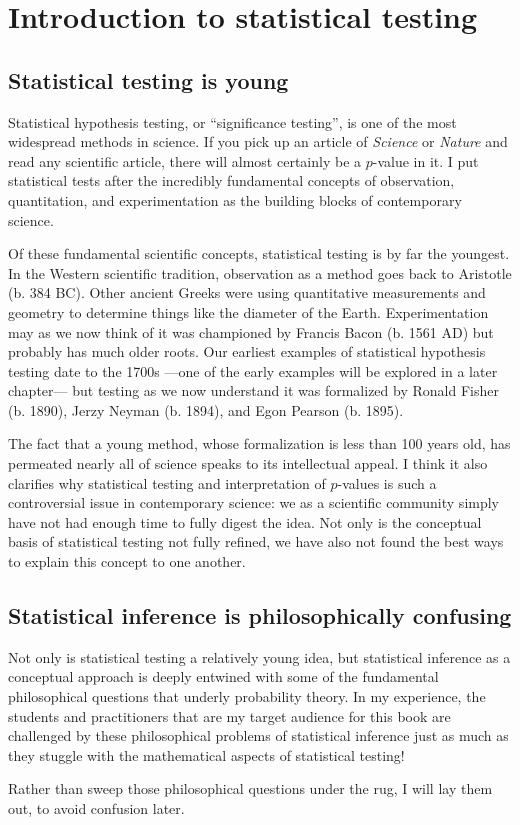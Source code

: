
\chapter{Introduction to statistical testing}

\section{Statistical testing is young}

Statistical hypothesis testing, or ``significance testing'', is one of the most
widespread methods in science. If you pick up an article of \textit{Science} or
\textit{Nature} and read any scientific article, there will almost certainly
be a $p$-value in
it. I put statistical tests after the incredibly fundamental concepts of
observation, quantitation, and experimentation as the building blocks of
contemporary science.

Of these fundamental scientific concepts, statistical testing is by far the youngest.
In the
Western scientific tradition, observation as a method goes back to Aristotle
(b. 384 BC). Other ancient Greeks were using quantitative measurements and
geometry to
determine things like the diameter of the Earth. Experimentation may as we now
think of it was championed by Francis Bacon (b. 1561 AD) but probably has much
older roots. Our earliest examples of statistical hypothesis testing date to
the 1700s ---one of the early examples will be explored in a later chapter---
but testing as we now understand it was formalized by Ronald Fisher (b. 1890),
Jerzy Neyman (b. 1894), and Egon Pearson (b. 1895).

The fact that a young method, whose formalization is less than 100 years old,
has permeated nearly all of science speaks to its intellectual appeal. I think
it also clarifies why statistical testing and interpretation of $p$-values is
such a controversial issue in contemporary science: we as a scientific
community simply have not had enough time to fully digest the idea. Not only is
the conceptual basis of statistical testing not fully refined, we have also
not found the best ways to explain this concept to one another.

\section{Statistical inference is philosophically confusing}

Not only is statistical testing a relatively young idea, but statistical
inference as a conceptual approach is deeply entwined with some of the
fundamental philosophical questions that underly probability theory.  In my
experience, the students and practitioners that are my target audience for this
book are challenged by these philosophical problems of statistical inference
just as much as they stuggle with the mathematical aspects of statistical
testing!

Rather than sweep those philosophical questions under the rug, I will lay them
out, to avoid confusion later.
